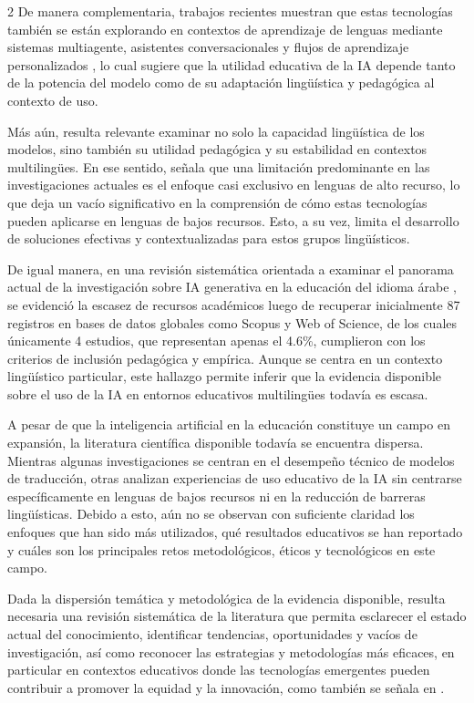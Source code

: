 \documentclass[12pt,twoside,titlepage]{ingenius}
\begin{document}
\begin{multicols}{2}
De manera complementaria, trabajos recientes muestran que estas tecnologías también se están explorando en contextos de aprendizaje de lenguas mediante sistemas multiagente, asistentes conversacionales y flujos de aprendizaje personalizados \cite{Nouzri2025,Tebourbi2025}, lo cual sugiere que la utilidad educativa de la IA depende tanto de la potencia del modelo como de su adaptación lingüística y pedagógica al contexto de uso.


Más aún, resulta relevante examinar no solo la capacidad lingüística de los modelos, sino también su utilidad pedagógica y su estabilidad en contextos multilingües. En ese sentido, \cite{Onan2026} señala que una limitación predominante en las investigaciones actuales es el enfoque casi exclusivo en lenguas de alto recurso, lo que deja un vacío significativo en la comprensión de cómo estas tecnologías pueden aplicarse en lenguas de bajos recursos. Esto, a su vez, limita el desarrollo de soluciones efectivas y contextualizadas para estos grupos lingüísticos.


De igual manera, en una revisión sistemática orientada a examinar el panorama actual de la investigación sobre IA generativa en la educación del idioma árabe \cite{Moustafa2026}, se evidenció la escasez de recursos académicos luego de recuperar inicialmente 87 registros en bases de datos globales como Scopus y Web of Science, de los cuales únicamente 4 estudios, que representan apenas el 4.6\%, cumplieron con los criterios de inclusión pedagógica y empírica. Aunque se centra en un contexto lingüístico particular, este hallazgo permite inferir que la evidencia disponible sobre el uso de la IA en entornos educativos multilingües todavía es escasa.


A pesar de que la inteligencia artificial en la educación constituye un campo en expansión, la literatura científica disponible todavía se encuentra dispersa. Mientras algunas investigaciones se centran en el desempeño técnico de modelos de traducción, otras analizan experiencias de uso educativo de la IA sin centrarse específicamente en lenguas de bajos recursos ni en la reducción de barreras lingüísticas. Debido a esto, aún no se observan con suficiente claridad los enfoques que han sido más utilizados, qué resultados educativos se han reportado y cuáles son los principales retos metodológicos, éticos y tecnológicos en este campo. 


Dada la dispersión temática y metodológica de la evidencia disponible, resulta necesaria una revisión sistemática de la literatura que permita esclarecer el estado actual del conocimiento, identificar tendencias, oportunidades y vacíos de investigación, así como reconocer las estrategias y metodologías más eficaces, en particular en contextos educativos donde las tecnologías emergentes pueden contribuir a promover la equidad y la innovación, como también se señala en \cite{Yoshida2025}.



\end{multicols}
\end{document}
